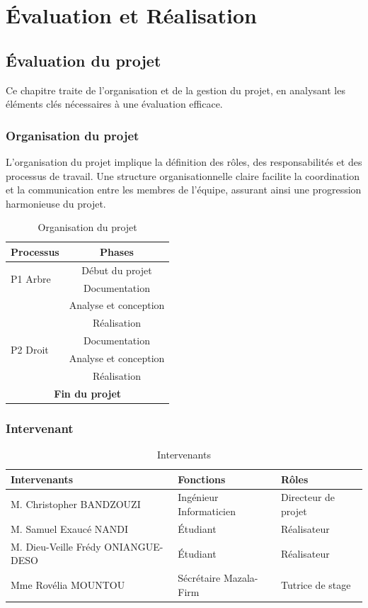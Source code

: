 \part{Évaluation et Réalisation}
\label{part:evaluation-et-realisation}
\chapter{Évaluation du projet}
Ce chapitre traite de l’organisation et de la gestion du projet, en analysant
les éléments clés nécessaires à une évaluation efficace.

\section{Organisation du projet}
L’organisation du projet implique la définition des rôles, des responsabilités
et des processus de travail. Une structure organisationnelle claire facilite
la coordination et la communication entre les membres de l’équipe, assurant
ainsi une progression harmonieuse du projet.

\begin{table}[H]
  \centering
  \begin{tabular}{|l|c|}
    \hline
    \textbf{Processus} & \textbf{Phases} \\ \hline
    \multirow{2}{*}{P1 Arbre} & Début du projet \\ \cline{2-2}
    & Documentation \\ \cline{2-2}
    & Analyse et conception \\ \cline{2-2}
    & Réalisation \\ \hline
    \multirow{2}{*}{P2 Droit} & Documentation \\ \cline{2-2}
    & Analyse et conception \\ \cline{2-2}
    & Réalisation \\ \hline
    \multicolumn{2}{|c|}{\textbf{Fin du projet}} \\ \hline
  \end{tabular}
  \caption{Organisation du projet}
\end{table}

\section{Intervenant}

\begin{table}[H]
  \centering
  \begin{tabularx}{\textwidth}{|l|l|X|}
    \hline
    \textbf{Intervenants} & \textbf{Fonctions} & \textbf{Rôles} \\ \hline
    M. Christopher BANDZOUZI & Ingénieur Informaticien & Directeur de projet  \\ \hline
    M. Samuel Exaucé NANDI & Étudiant & Réalisateur \\ \hline
    M. Dieu-Veille Frédy ONIANGUE-DESO & Étudiant & Réalisateur \\ \hline
    Mme Rovélia MOUNTOU & Sécrétaire Mazala-Firm & Tutrice de stage \\ \hline
  \end{tabularx}
  \caption{Intervenants}
\end{table}

